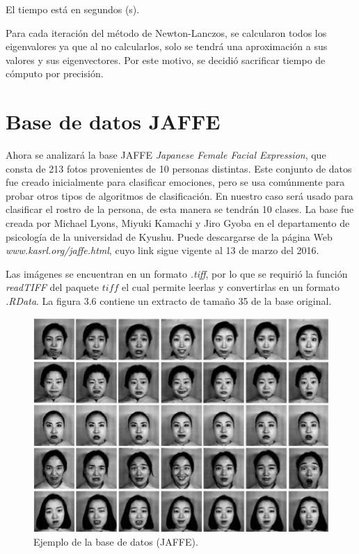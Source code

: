 El tiempo está en segundos (s).

Para cada iteración del método de Newton-Lanczos, se calcularon todos los eigenvalores ya que al no calcularlos, solo se tendrá una aproximación a sus valores y sus eigenvectores. Por este motivo, se decidió sacrificar tiempo de cómputo por precisión.

\pagebreak
\section{Base de datos JAFFE}


Ahora se analizará la base JAFFE \textit{Japanese Female Facial Expression}, que consta de 213 fotos provenientes de 10 personas distintas. Este conjunto de datos fue creado inicialmente para clasificar emociones, pero se usa comúnmente para probar otros tipos de algoritmos de clasificación. En nuestro caso será usado para clasificar el rostro de la persona, de esta manera se tendrán 10 clases. La base fue creada por Michael Lyons, Miyuki Kamachi y Jiro Gyoba en el departamento de psicología de la universidad de Kyushu. Puede descargarse de la página Web \textit{www.kasrl.org/jaffe.html}, cuyo link sigue vigente al 13 de marzo del 2016.

Las imágenes se encuentran en un formato \textit{.tiff}, por lo que se requirió la función \textit{readTIFF} del paquete $tiff$ el cual permite leerlas y convertirlas en un formato \textit{.RData}. La figura 3.6 contiene un extracto de tamaño 35 de la base original.

\begin{figure}[!ht]
  \centering
  \includegraphics[width=.8\textwidth]{Figures/Chapter4_Jaffe.png} 
  \caption{Ejemplo de la base de datos (JAFFE).}
\end{figure}

